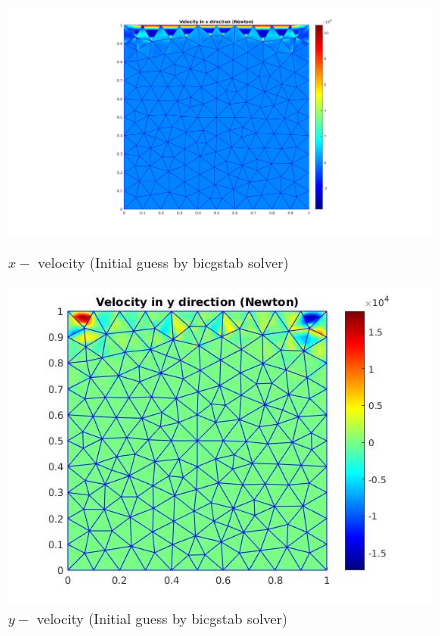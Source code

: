 \documentclass[a4paper]{book}
\begin{document}
\begin{figure}
  \begin{minipage}[c]{0.67\textwidth}
    \includegraphics[width=\textwidth]{lid_newton_vx_bicgstab.jpg}
  \end{minipage}\hfill
  \begin{minipage}[c]{0.3\textwidth}
    \caption{$x-$ velocity (Initial guess by bicgstab solver)}
  \label{x_vel_navier_stoke_bicgstab_lid}
  \end{minipage}
  \begin{minipage}[c]{0.67\textwidth}
    \includegraphics[width=\textwidth]{lid_newton_vy_bicgstab.jpg}
  \end{minipage}\hfill
  \begin{minipage}[c]{0.3\textwidth}
    \caption{$y-$ velocity (Initial guess by bicgstab solver)}
  \label{y_vel_navier_stoke_bicgstab_lid}
  \end{minipage}
  \begin{minipage}[c]{0.67\textwidth}

\end{minipage}
\end{figure}
\end{document}

